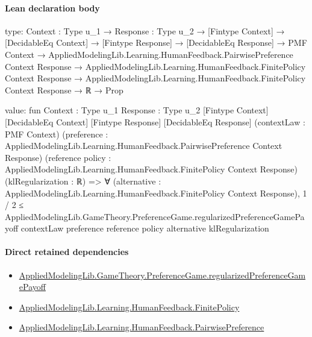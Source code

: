 \documentclass[10pt]{article}
\begin{document}
\paragraph{Lean declaration body}
\begin{ReviewVerbatim}
type:
{Context : Type u_1} →
  {Response : Type u_2} →
    [Fintype Context] →
      [DecidableEq Context] →
        [Fintype Response] →
          [DecidableEq Response] →
            PMF Context →
              AppliedModelingLib.Learning.HumanFeedback.PairwisePreference Context Response →
                AppliedModelingLib.Learning.HumanFeedback.FinitePolicy Context Response →
                  AppliedModelingLib.Learning.HumanFeedback.FinitePolicy Context Response → ℝ → Prop

value:
fun {Context : Type u_1} {Response : Type u_2} [Fintype Context] [DecidableEq Context] [Fintype Response]
    [DecidableEq Response] (contextLaw : PMF Context)
    (preference : AppliedModelingLib.Learning.HumanFeedback.PairwisePreference Context Response)
    (reference policy : AppliedModelingLib.Learning.HumanFeedback.FinitePolicy Context Response)
    (klRegularization : ℝ) =>
  ∀ (alternative : AppliedModelingLib.Learning.HumanFeedback.FinitePolicy Context Response),
    1 / 2 ≤
      AppliedModelingLib.GameTheory.PreferenceGame.regularizedPreferenceGamePayoff contextLaw preference reference
        policy alternative klRegularization
\end{ReviewVerbatim}

\paragraph{Direct retained dependencies}
\begin{itemize}\raggedright
\item \hyperlink{governing-declaration-957ca8dbdbec4af9}{Applied\allowbreak{}Modeling\allowbreak{}Lib.\allowbreak{}Game\allowbreak{}Theory.\allowbreak{}Preference\allowbreak{}Game.\allowbreak{}regularized\allowbreak{}Preference\allowbreak{}Game\allowbreak{}Payoff}
\item \hyperlink{governing-declaration-577316c60f45ef11}{Applied\allowbreak{}Modeling\allowbreak{}Lib.\allowbreak{}Learning.\allowbreak{}Human\allowbreak{}Feedback.\allowbreak{}Finite\allowbreak{}Policy}
\item \hyperlink{library-prerequisite-7e2db20cf087d9ba}{Applied\allowbreak{}Modeling\allowbreak{}Lib.\allowbreak{}Learning.\allowbreak{}Human\allowbreak{}Feedback.\allowbreak{}Pairwise\allowbreak{}Preference}
\end{itemize}
\hypertarget{governing-declaration-9c38d53b9d664221}{}
\end{document}
